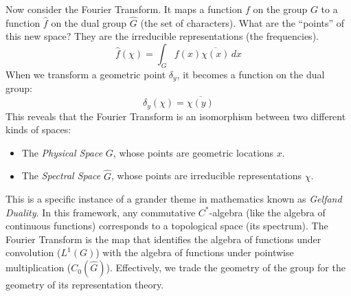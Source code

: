 \documentclass{article}
\begin{document}
Now consider the Fourier Transform. It maps a function $f$ on the group $G$ to a function $\hat{f}$ on the
dual group $\widehat{G}$ (the set of characters). What are the ``points'' of this new space? They are the
irreducible representations (the frequencies).
\[
    \hat{f}(\chi) = \int_G f(x) \overline{\chi(x)} \, dx
\]
When we transform a geometric point $\delta_y$, it becomes a function on the dual group:
\[
    \widehat{\delta_{y}}(\chi) = \overline{\chi(y)}
\]
This reveals that the Fourier Transform is an isomorphism between two different kinds of spaces:
\begin{itemize}
    \item The \emph{Physical Space} $G$, whose points are geometric locations $x$.
    \item The \emph{Spectral Space} $\widehat{G}$, whose points are irreducible representations $\chi$.
\end{itemize}

This is a specific instance of a grander theme in mathematics known as \emph{Gelfand Duality}. In this
framework, any commutative $C^*$-algebra (like the algebra of continuous functions) corresponds to a
topological space (its spectrum). The Fourier Transform is the map that identifies the algebra of functions
under convolution ($L^1(G)$) with the algebra of functions under pointwise multiplication ($C_0(\widehat{G})$).
Effectively, we trade the geometry of the group for the geometry of its representation theory.

\newpage
\printbibliography
\end{document}
